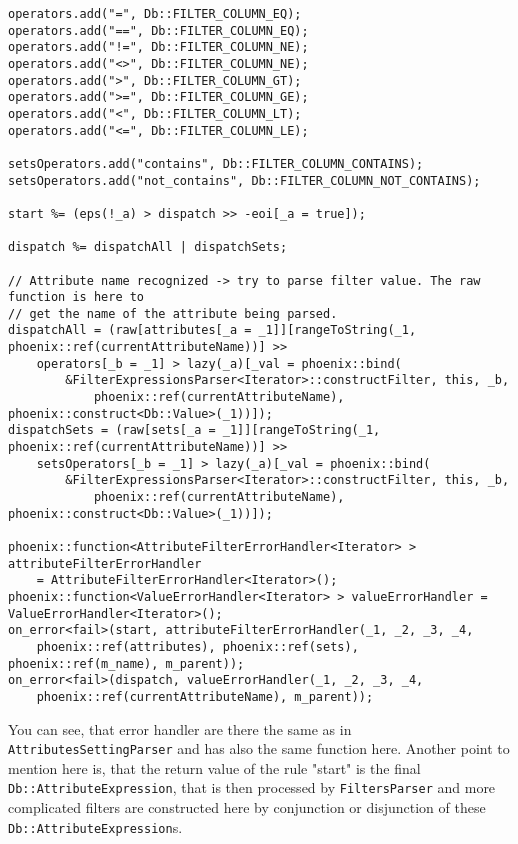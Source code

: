 \documentclass[deska]{subfiles}
\begin{document}
\begin{verbatim}
operators.add("=", Db::FILTER_COLUMN_EQ);
operators.add("==", Db::FILTER_COLUMN_EQ);
operators.add("!=", Db::FILTER_COLUMN_NE);
operators.add("<>", Db::FILTER_COLUMN_NE);
operators.add(">", Db::FILTER_COLUMN_GT);
operators.add(">=", Db::FILTER_COLUMN_GE);
operators.add("<", Db::FILTER_COLUMN_LT);
operators.add("<=", Db::FILTER_COLUMN_LE);

setsOperators.add("contains", Db::FILTER_COLUMN_CONTAINS);
setsOperators.add("not_contains", Db::FILTER_COLUMN_NOT_CONTAINS);

start %= (eps(!_a) > dispatch >> -eoi[_a = true]);

dispatch %= dispatchAll | dispatchSets;

// Attribute name recognized -> try to parse filter value. The raw function is here to
// get the name of the attribute being parsed.
dispatchAll = (raw[attributes[_a = _1]][rangeToString(_1, phoenix::ref(currentAttributeName))] >>
    operators[_b = _1] > lazy(_a)[_val = phoenix::bind(
        &FilterExpressionsParser<Iterator>::constructFilter, this, _b,
            phoenix::ref(currentAttributeName), phoenix::construct<Db::Value>(_1))]);
dispatchSets = (raw[sets[_a = _1]][rangeToString(_1, phoenix::ref(currentAttributeName))] >>
    setsOperators[_b = _1] > lazy(_a)[_val = phoenix::bind(
        &FilterExpressionsParser<Iterator>::constructFilter, this, _b,
            phoenix::ref(currentAttributeName), phoenix::construct<Db::Value>(_1))]);

phoenix::function<AttributeFilterErrorHandler<Iterator> > attributeFilterErrorHandler
    = AttributeFilterErrorHandler<Iterator>();
phoenix::function<ValueErrorHandler<Iterator> > valueErrorHandler = ValueErrorHandler<Iterator>();
on_error<fail>(start, attributeFilterErrorHandler(_1, _2, _3, _4,
    phoenix::ref(attributes), phoenix::ref(sets), phoenix::ref(m_name), m_parent));
on_error<fail>(dispatch, valueErrorHandler(_1, _2, _3, _4,
    phoenix::ref(currentAttributeName), m_parent));
\end{verbatim}

You can see, that error handler are there the same as in {\tt AttributesSettingParser} and has also the same function here.
Another point to mention here is, that the return value of the rule "start" is the final {\tt Db::AttributeExpression},
that is then processed by {\tt FiltersParser} and more complicated filters are constructed here by conjunction or disjunction
of these {\tt Db::AttributeExpression}s.
\end{document}
